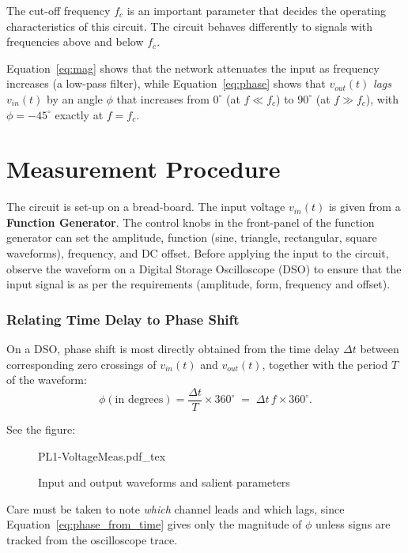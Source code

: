 The cut-off frequency $f_c$ is an important parameter that decides the operating characteristics of this circuit. The circuit behaves differently to signals with frequencies above and below $f_c$. 
 
Equation~\eqref{eq:mag} shows that the network attenuates the input as frequency increases (a low-pass filter), while Equation~\eqref{eq:phase} shows that $v_{out}(t)$ \emph{lags} $v_{in}(t)$ by an angle $\phi$ that increases from $0^\circ$ (at $f \ll f_c$) to $90^\circ$ (at $f \gg f_c$), with $\phi = -45^\circ$ exactly at $f = f_c$.

\section*{Measurement Procedure}

The circuit is set-up on a bread-board. The input voltage  $v_{in}(t)$ is given from a \textbf{Function Generator}. The control knobs in the front-panel of the function generator can set the amplitude, function (sine, triangle, rectangular, square waveforms), frequency, and DC offset. Before applying the input to the circuit, observe the waveform on a Digital Storage Oscilloscope (DSO) to ensure that the input signal is as per the requirements (amplitude, form, frequency and offset).

\subsubsection*{Relating Time Delay to Phase Shift}

On a DSO, phase shift is most directly obtained from the time delay $\Delta t$ between corresponding zero crossings of $v_{in}(t)$ and $v_{out}(t)$, together with the period $T$ of the waveform:
\begin{equation}
	\phi (\text{in degrees}) = \frac{\Delta t}{T}\times 360^\circ \;=\; \Delta t \, f \times 360^\circ.
	\label{eq:phase_from_time}
\end{equation}

See the figure:
\begin{figure}[!ht]
	\def\svgwidth{0.8\textwidth}
	{PL1-VoltageMeas.pdf_tex}
	\caption{Input and output waveforms and salient parameters}
\end{figure}

Care must be taken to note \emph{which} channel leads and which lags, since Equation~\eqref{eq:phase_from_time} gives only the magnitude of $\phi$ unless signs are tracked from the oscilloscope trace.

